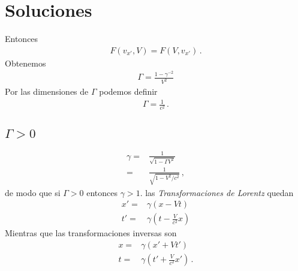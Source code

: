 \section{Soluciones}

Entonces
\begin{align*}
  F(v_{x'},V)=F(V,v_{x'})\,.
\end{align*}
Obtenemos %
\begin{align*}
  \Gamma=\frac{1-\gamma^{-2}}{V^2}
\end{align*}
Por las dimensiones de $\Gamma$ podemos definir
\begin{align*}
  \Gamma=\frac{1}{c^2}\,.
\end{align*}

\subsection{$\Gamma >0$}
\begin{align*}
  \gamma=&\frac{1}{\sqrt{1-\Gamma V^2}}\nonumber\\
  =&\frac{1}{\sqrt{1-V^2/c^2}}\,,
\end{align*}
de modo que si $\Gamma>0$ entonces $\gamma>1$. las \emph{Transformaciones de Lorentz} quedan
\begin{align}
  \label{eq:lorentz}
  x'=&\gamma(x-V t)\nonumber\\
  t'=&\gamma\left(t-\frac{V}{c^2}x\right)
\end{align}
Mientras que las transformaciones inversas son
\begin{align}
  \label{eq:lorentzinv}
  x=&\gamma(x'+V t')\nonumber\\
  t=&\gamma\left(t'+\frac{V}{c^2}x'\right)\,.
\end{align}



